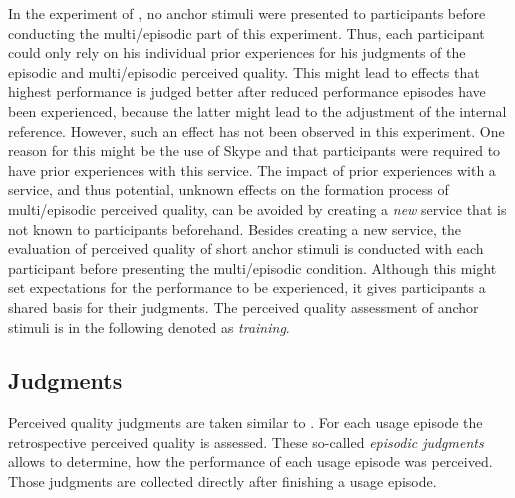 In the experiment of \citet{moller_single-call_2011}, no anchor stimuli were presented to participants before conducting the multi\-/episodic part of this experiment.
Thus, each participant could only rely on his individual prior experiences for his judgments of the episodic and multi\-/episodic perceived quality.
This might lead to effects that highest performance is judged better after reduced performance episodes have been experienced, because the latter might lead to the adjustment of the internal reference.
However, such an effect has not been observed in this experiment.
One reason for this might be the use of Skype and that participants were required to have prior experiences with this service.
The impact of prior experiences with a service, and thus potential, unknown effects on the formation process of multi\-/episodic perceived quality, can be avoided by creating a \emph{new} service that is not known to participants beforehand.
Besides creating a new service, the evaluation of perceived quality of short anchor stimuli is conducted with each participant before presenting the multi\-/episodic condition.
Although this might set expectations for the performance to be experienced, it gives participants a shared basis for their judgments.
The perceived quality assessment of anchor stimuli is in the following denoted as \emph{training}.


\subsection{Judgments}
Perceived quality judgments are taken similar to \citet{moller_single-call_2011}.
For each usage episode the retrospective perceived quality is assessed.
These so-called \emph{episodic judgments} allows to determine, how the performance of each usage episode was perceived.
Those judgments are collected directly after finishing a usage episode.

